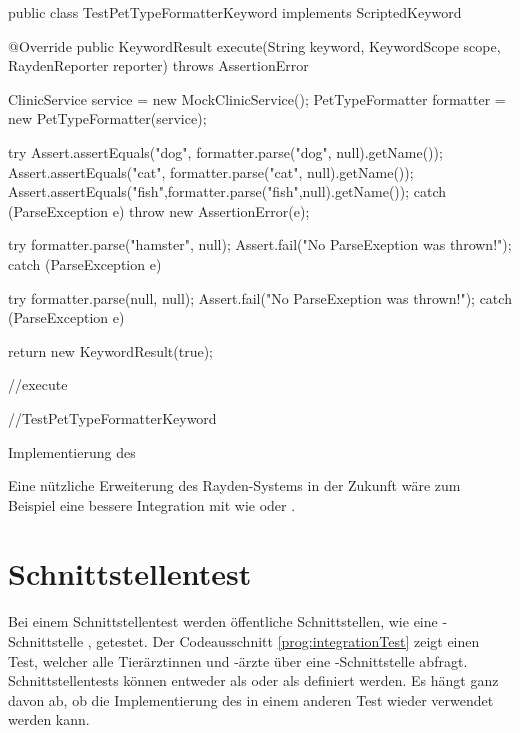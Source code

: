 \begin{program}
\begin{JavaCode}
public class TestPetTypeFormatterKeyword implements ScriptedKeyword {

  @Override
  public KeywordResult execute(String keyword, KeywordScope scope, 
	  RaydenReporter reporter) throws  AssertionError {
    ClinicService service = new MockClinicService();
    PetTypeFormatter formatter = new PetTypeFormatter(service);

    try {
     Assert.assertEquals("dog", formatter.parse("dog", null).getName());
     Assert.assertEquals("cat", formatter.parse("cat", null).getName());
     Assert.assertEquals("fish",formatter.parse("fish",null).getName());
    } catch (ParseException e) {
      throw new AssertionError(e);
    }
    
    try {
      formatter.parse("hamster", null);
      Assert.fail("No ParseExeption was thrown!");
    } catch (ParseException e) {
    }

    try {
      formatter.parse(null, null);
      Assert.fail("No ParseExeption was thrown!");
    } catch (ParseException e) {
    }

    return new KeywordResult(true);
  } //execute
	
} //TestPetTypeFormatterKeyword
\end{JavaCode}
\caption{Implementierung des  }
\label{prog:unitTestImpl}
\end{program}

\SuperPar
Eine nützliche Erweiterung des Rayden-Systems in der Zukunft wäre zum Beispiel eine bessere Integration mit  wie  oder .

\section{Schnittstellentest}
\label{cha:TestenApi}

Bei einem Schnittstellentest werden öffentliche Schnittstellen, wie eine -Schnittstelle \cite{Rest}, getestet. Der Codeausschnitt \ref{prog:integrationTest} zeigt einen Test, welcher alle Tierärztinnen und -ärzte über eine -Schnittstelle abfragt. Schnittstellentests können entweder als  oder als  definiert werden. Es hängt ganz davon ab, ob die Implementierung des  in einem anderen Test wieder verwendet werden kann. 

